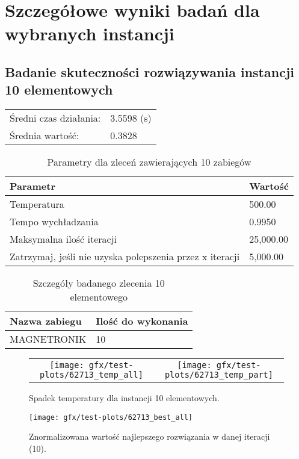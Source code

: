 \section{Szczegółowe wyniki badań dla wybranych instancji}
\subsection{Badanie skuteczności rozwiązywania instancji 10 elementowych}
\begin{table}[H]
\begin{tabular}{ l l }
	Średni czas działania: & 3.5598 (s) \\
Średnia wartość: & 0.3828 \\
\end{tabular}
\end{table}
\begin{table}[H]
\centering
\begin{tabularx}{1\textwidth}{ | l | X | }
\hline
\bfseries Parametr & \bfseries Wartość \\
\hline
Temperatura & 500.00 \\
\hline
Tempo wychładzania & 0.9950 \\
\hline
Maksymalna ilość iteracji & 25,000.00 \\
\hline
Zatrzymaj, jeśli nie uzyska polepszenia przez x iteracji & 5,000.00 \\
\hline
\end{tabularx}
\caption{Parametry dla zleceń zawierających 10 zabiegów}
\end{table}

\begin{table}[H]
\centering
\begin{tabularx}{1\textwidth}{ | X | l | }
\hline
\bfseries Nazwa zabiegu & \bfseries Ilość do wykonania \\
\hline
MAGNETRONIK & 10 \\
\hline
\end{tabularx}
\caption{Szczegóły badanego zlecenia 10 elementowego}
\end{table}
\begin{figure}[H]
\centering
\begin{table}[H]
\centering
\begin{tabularx}{1\textwidth}{ c c }
\texttt{[image: gfx/test-plots/62713\_temp\_all]} & \texttt{[image: gfx/test-plots/62713\_temp\_part]} \\
\end{tabularx}
\end{table}
\caption{Spadek temperatury dla instancji 10 elementowych.}
\end{figure}
\begin{figure}[H]
\centering
\texttt{[image: gfx/test-plots/62713\_best\_all]}
\caption{Znormalizowana wartość najlepszego rozwiązania w danej iteracji (10).}
\label{temp-10}
\end{figure}
